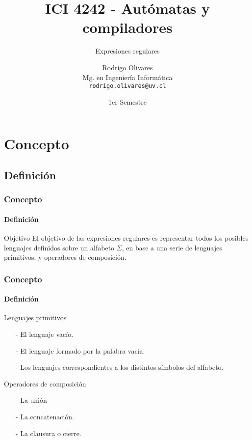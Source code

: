 \documentclass{beamer}
\title[\textbf{ICI 4242 - Aut\'omatas y compiladores}]{\textbf{ICI 4242 - Aut\'omatas y compiladores}}
\subtitle{Expresiones regulares}
\author[Rodrigo Olivares]
{
	Rodrigo Olivares \\
	\vspace{0.5mm}
	Mg. en Ingenier\'ia Inform\'atica \\
	\vspace{0.5mm}
	\texttt{\normalsize rodrigo.olivares@uv.cl}
}
\institute[PUCV]
\date{1er Semestre}
\begin{document}
	\begin{frame}
		\titlepage
	\end{frame}


	\section{Concepto}

		\subsection{Definici\'on}

		\begin{frame}
			\frametitle{Concepto}
			\framesubtitle{Definici\'on}

			\begin{block}{Objetivo}
			    El objetivo de las expresiones regulares es representar todos los posibles lenguajes definidos sobre un alfabeto $\Sigma$, en base a una serie de lenguajes primitivos, y operadores de composici\'on.
			\end{block}
		\end{frame}

		\begin{frame}
			\frametitle{Concepto}
			\framesubtitle{Definici\'on}

			\begin{block}{Lenguajes primitivos}
			    \begin{itemize}
			        \item[-] El lenguaje vac\'io.
			        \item[-] El lenguaje formado por la palabra vac\'ia.
			        \item[-] Los lenguajes correspondientes a los distintos s\'imbolos del alfabeto.
			    \end{itemize}
			\end{block}
			\begin{block}{Operadores de composici\'on}
			    \begin{itemize}
			        \item[-] La uni\'on 
			        \item[-] La concatenaci\'on.
			        \item[-] La clausura o cierre.
			    \end{itemize}
			\end{block}
		\end{frame}
\end{document}
